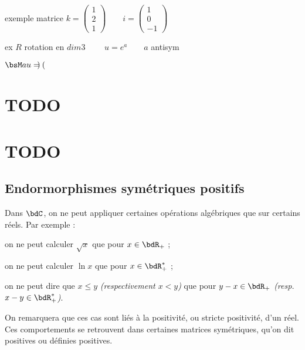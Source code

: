 \documentclass[a4paper,french,bookmarks]{book}
\begin{document}
    \begin{form}{exemple matrice}{}
        $k = \begin{pmatrix}
1 \\
2 \\ 
1
\end{pmatrix} \qquad i = \begin{pmatrix}
1 \\
0 \\
-1
\end{pmatrix}$
    
    ex $R$ rotation en $dim 3 \qquad$
    $u=e^a \qquad  a$ antisym
    \vspace{1cm}
    
    $\bsM a u = \begin{pmatrix}
\end{pmatrix}$
    
    \end{form}
    
    
    \section{TODO}
    \section{TODO}
    
    \newpage
    
    \subsection{Endormorphismes symétriques positifs}
    
    Dans $\bdC$, on ne peut appliquer certaines opérations algébriques que sur certains réels. Par exemple :
    \begin{enumerate}
        \itt on ne peut calculer $\sqrt{x}$ que pour $x \in \bdR_+$ ;
        
        \itt on ne peut calculer $\ln{x}$ que pour $x \in \bdR_+^*$ ;
        
        \itt on ne peut dire que $x \leq y$ \emph{(respectivement $x < y$)} que pour $y - x \in \bdR_+$ \emph{(resp. $x - y \in \bdR_+^*$)}.
    \end{enumerate}
    On remarquera que ces cas sont liés à la positivité, ou stricte positivité, d'un réel. Ces comportements se retrouvent dans certaines matrices symétriques, qu'on dit positives ou définies positives.
    
\end{document}
